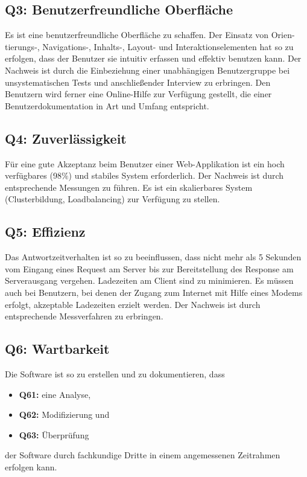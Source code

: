 \documentclass[10pt,a4paper]{scrartcl}
\begin{document}
\subsection{Q3: Benutzerfreundliche Oberfläche}
Es ist eine benutzerfreundliche Oberfläche zu schaffen. Der Einsatz von Orien-tierungs-, Navigations-, Inhalts-, Layout- und Interaktionselementen hat so zu erfolgen, dass der Benutzer sie intuitiv erfassen und effektiv benutzen kann. Der Nachweis ist durch die Einbeziehung einer unabhängigen Benutzergruppe bei unsystematischen Tests und anschließender Interview zu erbringen. Den Benutzern wird ferner eine Online-Hilfe zur Verfügung gestellt, die einer Benutzerdokumentation in Art und Umfang entspricht.


\subsection{Q4: Zuverlässigkeit}
Für eine gute Akzeptanz beim Benutzer einer Web-Applikation ist ein hoch verfügbares (98$\%$) und stabiles System erforderlich. Der Nachweis ist durch entsprechende Messungen zu führen. Es ist ein skalierbares System (Clusterbildung, Loadbalancing) zur Verfügung zu stellen.


\subsection{Q5: Effizienz}
Das Antwortzeitverhalten ist so zu beeinflussen, dass nicht mehr als 5 Sekunden vom Eingang eines Request am Server bis zur Bereitstellung des Response am Serverausgang vergehen. Ladezeiten am Client sind zu minimieren. Es müssen auch bei Benutzern, bei denen der Zugang zum Internet mit Hilfe eines Modems erfolgt, akzeptable Ladezeiten erzielt werden. Der Nachweis ist durch entsprechende Messverfahren zu erbringen.

\subsection{Q6: Wartbarkeit}

Die Software ist so zu erstellen und zu dokumentieren, dass
\begin{itemize}
\item[] \textbf{Q61:} eine Analyse,
\item[] \textbf{Q62:} Modifizierung und
\item[] \textbf{Q63:} Überprüfung
\end{itemize}
der Software durch fachkundige Dritte in einem angemessenen Zeitrahmen erfolgen kann.
\end{document}
